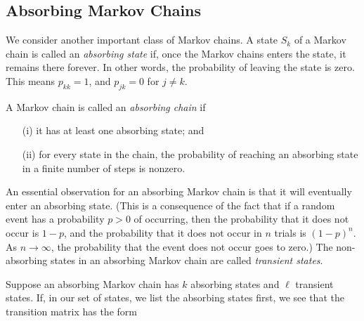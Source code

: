 \documentclass{book}
\begin{document}
\subsection*{Absorbing Markov Chains}

We consider another important class of Markov chains.
A state $S_k$ of a Markov chain is called
an \emph{absorbing state} if, once the Markov chains enters
the state, it remains there forever.  In other words,
the probability of leaving the state is zero.
This means $p_{kk} = 1$, and $p_{jk} = 0$ for $j\ne k$.

A Markov chain is called an \emph{absorbing chain}
if
\begin{enumerate}
\item[(i)] it has at least one absorbing state; and
\item[(ii)] for every state in the chain, the probability
of reaching an absorbing state in a finite number
of steps is nonzero.
\end{enumerate}
An essential observation for an absorbing Markov chain
is that it will eventually enter an absorbing state.
(This is a consequence of the fact that if
a random event has a probability $p>0$ of occurring,
then the probability that it does not occur is $1-p$,
and the probability that it does not occur in $n$
trials is $(1-p)^n$.  As $n\rightarrow\infty$, the
probability that the event does not occur
goes to zero.)
The non-absorbing states in an absorbing Markov chain
are called \emph{transient states}.

\medskip
Suppose an absorbing Markov chain
has $k$ absorbing states and $\ell$ transient
states.
If, in our set of states, we list the absorbing
states first, we see that the
transition matrix has the form
\end{document}
